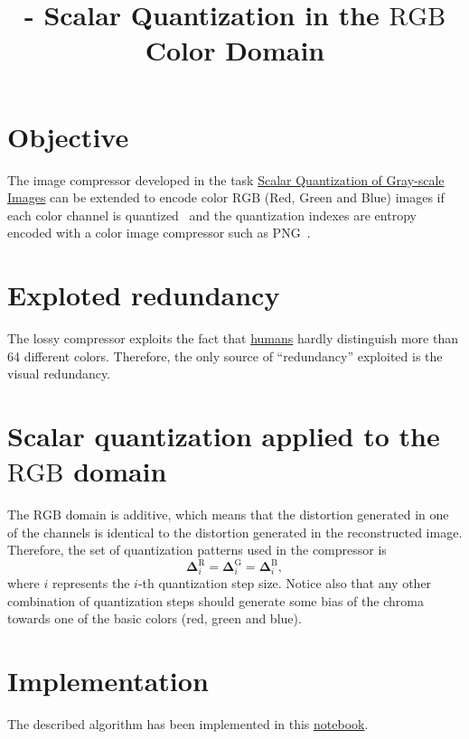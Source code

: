 

\title{\SM{} - Scalar Quantization in the $\text{RGB}$ Color Domain}

\maketitle
\tableofcontents

\section{Objective}
The image compressor developed in the task
\href{https://sistemas-multimedia.github.io/contents/gray_SQ/}{Scalar
  Quantization of Gray-scale Images} can be extended to encode color
$\text{RGB}$ (Red, Green and Blue) images if each color channel is
quantized~\cite{vruiz__scalar_quantization} and the quantization
indexes are entropy encoded with a color image compressor such as
PNG~\cite{vruiz__PNG}.

\section{Exploted redundancy}
The lossy compressor exploits the fact that
\href{https://en.wikipedia.org/wiki/Visual_system}{humans} hardly
distinguish more than 64 different colors. Therefore, the only source
of ``redundancy'' exploited is the visual redundancy.

\section{Scalar quantization applied to the $\text{RGB}$ domain}
The $\text{RGB}$ domain is additive, which means that the distortion
generated in one of the channels is identical to the distortion
generated in the reconstructed image. Therefore, the set of quantization patterns used in the compressor is
\begin{equation}
  \mathbf{\Delta}^{\text{R}}_i = \mathbf{\Delta}^{\text{G}}_i =
  \mathbf{\Delta}^{\text{B}}_i,
  \label{eq:simple_Q}
\end{equation}
where $i$ represents the $i$-th quantization step size.  Notice also
that any other combination of quantization steps should generate some
bias of the chroma towards one of the basic colors (red, green and
blue).

\section{Implementation}
The described algorithm has been implemented in this
\href{https://github.com/Sistemas-Multimedia/Sistemas-Multimedia.github.io/blob/master/contents/RGB_SQ/RGB_SQ.ipynb}{notebook}.

